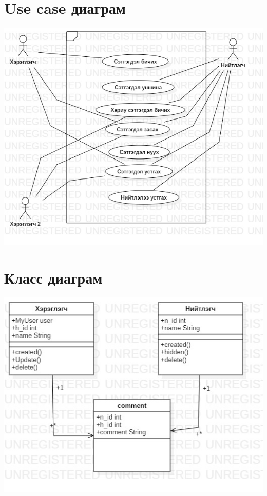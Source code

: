 \documentclass[12pt]{article}
\begin{document}
	\section{Use case диаграм}
	\includegraphics[scale=0.5]{UseCaseDiagram} 
	
	\section{Класс диаграм}
	\includegraphics[scale=0.5]{commentclass} 
	
\end{document}
